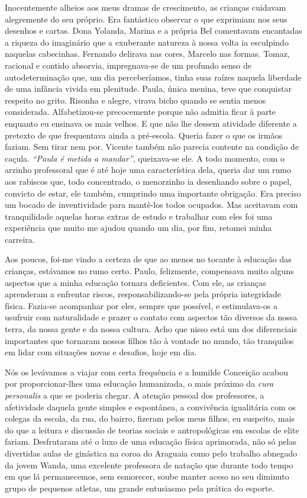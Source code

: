 Inocentemente alheios aos meus dramas de crescimento, as crianças cuidavam alegremente do seu próprio.
Era fantástico observar o que exprimiam nos seus desenhos e cartas.
Dona Yolanda, Marina e a própria Bel comentavam encantadas a riqueza do imaginário que a exuberante natureza à nossa volta ia esculpindo naquelas cabecinhas.
Fernando delirava nas cores, Marcelo nas formas.
Tomaz, racional e contido absorvia, impregnava-se de um profundo senso de autodeterminação que, um dia perceberíamos, tinha suas raízes naquela liberdade de uma infância vivida em plenitude.
Paula, única menina, teve que conquistar respeito no grito.
Risonha e alegre, virava bicho quando se sentia menos considerada.
Alfabetizou-se precocemente porque não admitia ficar à parte enquanto eu ensinava os mais velhos.
E que não lhe dessem atividade diferente a pretexto de que frequentava ainda a pré-escola.
Queria fazer o que os irmãos faziam.
Sem tirar nem por.
Vicente também não parecia contente na condição de caçula.
\textit{``Paula é metida a mandar''}, queixava-se ele.
A todo momento, com o arzinho professoral que é até hoje uma característica dela, queria dar um rumo aos rabiscos que, todo concentrado, o menorzinho ia desenhando sobre o papel, convicto de estar, ele também, cumprindo uma importante obrigação.
Era preciso um bocado de inventividade para mantê-los todos ocupados.
Mas aceitavam com tranquilidade aquelas horas extras de estudo e trabalhar com eles foi uma experiência que muito me ajudou quando um dia, por fim, retomei minha carreira.

Aos poucos, foi-me vindo a certeza de que ao menos no tocante à educação das crianças, estávamos no rumo certo.
Paulo, felizmente, compensava muito alguns aspectos que a minha educação tornara deficientes.
Com ele, as crianças aprenderam a enfrentar riscos, responsabilizando-se pela própria integridade física.
Fazia-se acompanhar por eles, sempre que possível, e estimulava-os a usufruir com naturalidade e prazer o contato com aspectos tão diversos da nossa terra, da nossa gente e da nossa cultura.
Acho que nisso está um dos diferenciais importantes que tornaram nossos filhos tão à vontade no mundo, tão tranquilos em lidar com situações novas e desafios, hoje em dia.


Nós os levávamos a viajar com certa frequência e a humilde Conceição acabou por proporcionar-lhes uma educação humanizada, o mais próximo da \textit{cura personalis} a que se poderia chegar.
A atenção pessoal dos professores, a afetividade daquela gente simples e espontânea, a convivência igualitária com os colegas da escola, da rua, do bairro, fizeram pelos meus filhos, eu suspeito, mais do que a leitura e discussão de teorias sociais e antropológicas em escolas de elite fariam.
Desfrutaram até o luxo de uma educação física aprimorada, não só pelas divertidas aulas de ginástica na coroa do Araguaia como pelo trabalho abnegado da jovem Wanda, uma excelente professora de natação que durante todo tempo em que lá permanecemos, sem esmorecer, soube manter aceso no seu diminuto grupo de pequenos atletas, um grande entusiasmo pela prática do esporte.

